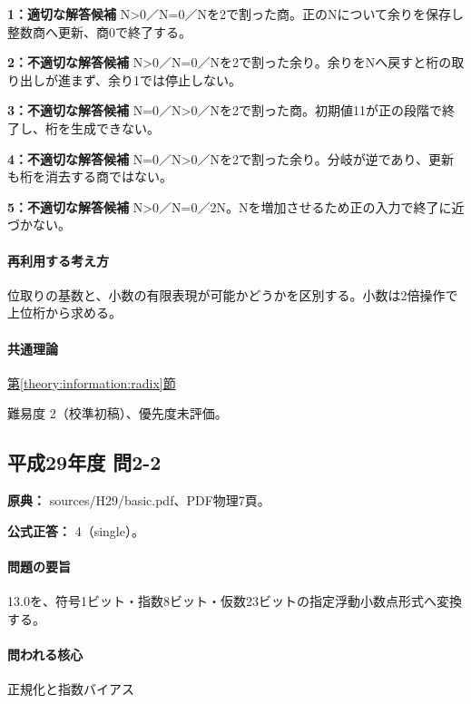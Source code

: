 \noindent\textbf{1：適切な解答候補} N>0／N=\allowbreak{}0／Nを2で割った商。正のNについて余りを保存し整数商へ更新、商0で終了する。\par

\noindent\textbf{2：不適切な解答候補} N>0／N=\allowbreak{}0／Nを2で割った余り。余りをNへ戻すと桁の取り出しが進まず、余り1では停止しない。\par

\noindent\textbf{3：不適切な解答候補} N=\allowbreak{}0／N>0／Nを2で割った商。初期値11が正の段階で終了し、桁を生成できない。\par

\noindent\textbf{4：不適切な解答候補} N=\allowbreak{}0／N>0／Nを2で割った余り。分岐が逆であり、更新も桁を消去する商ではない。\par

\noindent\textbf{5：不適切な解答候補} N>0／N=\allowbreak{}0／2N。Nを増加させるため正の入力で終了に近づかない。\par

\paragraph{再利用する考え方} 位取りの基数と、小数の有限表現が可能かどうかを区別する。小数は2倍操作で上位桁から求める。

\paragraph{共通理論} \hyperref[theory:information:radix]{第\ref*{theory:information:radix}節}

\par 難易度 2（校準初稿）、優先度未評価。

\subsection{平成29年度 問2-2}
\label{q:h29-reg-basic-2-2}

\noindent\textbf{原典：} sources/H29/basic.pdf、PDF物理7頁。

\textbf{公式正答：} 4（single）。

\paragraph{問題の要旨} 13.0を、符号1ビット・指数8ビット・仮数23ビットの指定浮動小数点形式へ変換する。

\paragraph{問われる核心} 正規化と指数バイアス

